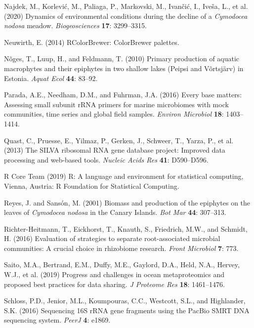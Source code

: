 \documentclass[12pt,]{article}
\begin{document}
\leavevmode\hypertarget{ref-Najdek2020}{}%
Najdek, M., Korlević, M., Paliaga, P., Markovski, M., Ivančić, I.,
Iveša, L., et al. (2020) Dynamics of environmental conditions during the
decline of a \emph{Cymodocea nodosa} meadow. \emph{Biogeosciences}
\textbf{17}: 3299--3315.

\leavevmode\hypertarget{ref-Neuwirth2014}{}%
Neuwirth, E. (2014) RColorBrewer: ColorBrewer palettes.

\leavevmode\hypertarget{ref-Noges2010}{}%
Nõges, T., Luup, H., and Feldmann, T. (2010) Primary production of
aquatic macrophytes and their epiphytes in two shallow lakes (Peipsi and
Võrtsjärv) in Estonia. \emph{Aquat Ecol} \textbf{44}: 83--92.

\leavevmode\hypertarget{ref-Parada2016}{}%
Parada, A.E., Needham, D.M., and Fuhrman, J.A. (2016) Every base
matters: Assessing small subunit rRNA primers for marine microbiomes
with mock communities, time series and global field samples.
\emph{Environ Microbiol} \textbf{18}: 1403--1414.

\leavevmode\hypertarget{ref-Quast2013}{}%
Quast, C., Pruesse, E., Yilmaz, P., Gerken, J., Schweer, T., Yarza, P.,
et al. (2013) The SILVA ribosomal RNA gene database project: Improved
data processing and web-based tools. \emph{Nucleic Acids Res}
\textbf{41}: D590--D596.

\leavevmode\hypertarget{ref-RCoreTeam2019}{}%
R Core Team (2019) R: A language and environment for statistical
computing, Vienna, Austria: R Foundation for Statistical Computing.

\leavevmode\hypertarget{ref-Reyes2001}{}%
Reyes, J. and Sansón, M. (2001) Biomass and production of the epiphytes
on the leaves of \emph{Cymodocea nodosa} in the Canary Islands.
\emph{Bot Mar} \textbf{44}: 307--313.

\leavevmode\hypertarget{ref-Richter-Heitmann2016}{}%
Richter-Heitmann, T., Eickhorst, T., Knauth, S., Friedrich, M.W., and
Schmidt, H. (2016) Evaluation of strategies to separate root-associated
microbial communities: A crucial choice in rhizobiome research.
\emph{Front Microbiol} \textbf{7}: 773.

\leavevmode\hypertarget{ref-Saito2019}{}%
Saito, M.A., Bertrand, E.M., Duffy, M.E., Gaylord, D.A., Held, N.A.,
Hervey, W.J., et al. (2019) Progress and challenges in ocean
metaproteomics and proposed best practices for data sharing. \emph{J
Proteome Res} \textbf{18}: 1461--1476.

\leavevmode\hypertarget{ref-Schloss2016}{}%
Schloss, P.D., Jenior, M.L., Koumpouras, C.C., Westcott, S.L., and
Highlander, S.K. (2016) Sequencing 16S rRNA gene fragments using the
PacBio SMRT DNA sequencing system. \emph{PeerJ} \textbf{4}: e1869.
\end{document}
